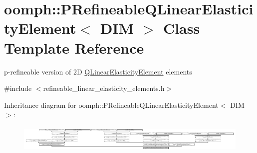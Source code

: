 \hypertarget{classoomph_1_1PRefineableQLinearElasticityElement}{}\section{oomph\+:\+:P\+Refineable\+Q\+Linear\+Elasticity\+Element$<$ D\+IM $>$ Class Template Reference}
\label{classoomph_1_1PRefineableQLinearElasticityElement}


p-\/refineable version of 2D \hyperlink{classoomph_1_1QLinearElasticityElement}{Q\+Linear\+Elasticity\+Element} elements  




{\ttfamily \#include $<$refineable\+\_\+linear\+\_\+elasticity\+\_\+elements.\+h$>$}

Inheritance diagram for oomph\+:\+:P\+Refineable\+Q\+Linear\+Elasticity\+Element$<$ D\+IM $>$\+:\begin{figure}[H]
\begin{center}
\leavevmode
\includegraphics[height=1.320755cm]{classoomph_1_1PRefineableQLinearElasticityElement}
\end{center}
\end{figure}
